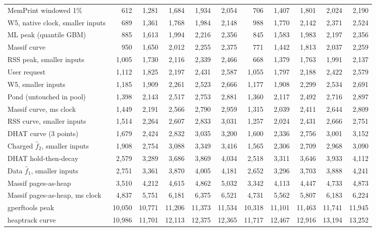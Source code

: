 \begin{tabular}{lrrrrrrrrrr}
MemPrint windowed 1\% & 612 & 1{,}281 & 1{,}684 & 1{,}934 & 2{,}054 & 706 & 1{,}407 & 1{,}801 & 2{,}024 & 2{,}190 \\
\memprint{} W5, native clock, smaller inputs & 689 & 1{,}361 & 1{,}768 & 1{,}984 & 2{,}148 & 988 & 1{,}770 & 2{,}142 & 2{,}371 & 2{,}524 \\
ML peak (quantile GBM) & 885 & 1{,}613 & 1{,}994 & 2{,}216 & 2{,}356 & 845 & 1{,}583 & 1{,}983 & 2{,}197 & 2{,}356 \\
Massif curve & 950 & 1{,}650 & 2{,}012 & 2{,}255 & 2{,}375 & 771 & 1{,}442 & 1{,}813 & 2{,}037 & 2{,}259 \\
RSS peak, smaller inputs & 1{,}005 & 1{,}730 & 2{,}116 & 2{,}339 & 2{,}466 & 668 & 1{,}379 & 1{,}763 & 1{,}991 & 2{,}137 \\
User request & 1{,}112 & 1{,}825 & 2{,}197 & 2{,}431 & 2{,}587 & 1{,}055 & 1{,}797 & 2{,}188 & 2{,}422 & 2{,}579 \\
\memprint{} W5, smaller inputs & 1{,}185 & 1{,}909 & 2{,}261 & 2{,}523 & 2{,}666 & 1{,}177 & 1{,}908 & 2{,}299 & 2{,}534 & 2{,}691 \\
Pond (untouched in pool) & 1{,}398 & 2{,}143 & 2{,}517 & 2{,}753 & 2{,}881 & 1{,}360 & 2{,}117 & 2{,}492 & 2{,}716 & 2{,}897 \\
Massif curve, ms clock & 1{,}449 & 2{,}191 & 2{,}566 & 2{,}790 & 2{,}959 & 1{,}315 & 2{,}039 & 2{,}411 & 2{,}644 & 2{,}809 \\
RSS curve, smaller inputs & 1{,}514 & 2{,}264 & 2{,}607 & 2{,}833 & 3{,}031 & 1{,}257 & 2{,}024 & 2{,}431 & 2{,}666 & 2{,}751 \\
DHAT curve (3 points) & 1{,}679 & 2{,}424 & 2{,}832 & 3{,}035 & 3{,}200 & 1{,}600 & 2{,}336 & 2{,}756 & 3{,}001 & 3{,}152 \\
Charged $\hat f_2$, smaller inputs & 1{,}908 & 2{,}754 & 3{,}088 & 3{,}349 & 3{,}416 & 1{,}565 & 2{,}306 & 2{,}709 & 2{,}968 & 3{,}090 \\
DHAT hold-then-decay & 2{,}579 & 3{,}289 & 3{,}686 & 3{,}869 & 4{,}034 & 2{,}518 & 3{,}311 & 3{,}646 & 3{,}933 & 4{,}112 \\
Data $\hat f_1$, smaller inputs & 2{,}751 & 3{,}361 & 3{,}870 & 4{,}005 & 4{,}181 & 2{,}652 & 3{,}296 & 3{,}703 & 3{,}888 & 4{,}241 \\
Massif pages-as-heap & 3{,}510 & 4{,}212 & 4{,}615 & 4{,}862 & 5{,}032 & 3{,}342 & 4{,}113 & 4{,}447 & 4{,}733 & 4{,}873 \\
Massif pages-as-heap, ms clock & 4{,}837 & 5{,}751 & 6{,}181 & 6{,}375 & 6{,}521 & 4{,}731 & 5{,}562 & 5{,}807 & 6{,}183 & 6{,}224 \\
gperftools peak & 10{,}050 & 10{,}771 & 11{,}206 & 11{,}373 & 11{,}534 & 10{,}318 & 11{,}101 & 11{,}463 & 11{,}741 & 11{,}945 \\
heaptrack curve & 10{,}986 & 11{,}701 & 12{,}113 & 12{,}375 & 12{,}365 & 11{,}717 & 12{,}467 & 12{,}916 & 13{,}194 & 13{,}252 \\
\bottomrule
\end{tabular}
